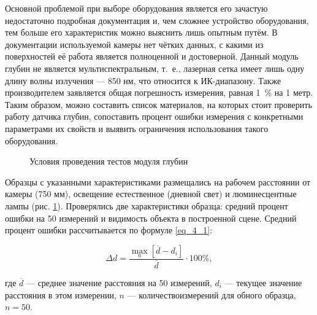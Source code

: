 Основной проблемой при выборе оборудования является его зачастую недостаточно подробная документация и, чем сложнее устройство оборудования, тем больше его характеристик можно выяснить лишь опытным путём. В документации используемой камеры нет чётких данных, с какими из поверхностей её работа является полноценной и достоверной. Данный модуль глубин не является мультиспектральным, т.~е., лазерная сетка имеет лишь одну длину волны излучения --- 850 нм, что относится к ИК-диапазону. Также производителем заявляется общая погрешность измерения, равная 1~\% на 1 метр. Таким образом, можно составить список материалов, на которых стоит проверить работу датчика глубин, сопоставить процент ошибки измерения с конкретными параметрами их свойств и выявить ограничения использования такого оборудования.

\begin{figure}[ht]
	\caption{Условия проведения тестов модуля глубин}\label{fig:izmer}
\end{figure}

Образцы с указанными характеристиками размещались на рабочем расстоянии от камеры (750 мм), освещение естественное (дневной свет) и люминесцентные лампы (рис. \cref{fig:izmer}). Проверялись две характеристики образца: средний процент ошибки на 50 измерений и видимость объекта в построенной сцене. Средний процент ошибки рассчитывается по формуле \cref{eq_4_1}:

\begin{equation}
\Delta d = \frac {\max_{n} [\overline{d} - d_i]} {\overline{d}} \cdot 100 \%,
\label{eq_4_1}
\end{equation}

где $\overline{d}$ --- среднее значение расстояния на 50 измерений, $d_i$ --- текущее значение расстояния в этом измерении, $n$ --- количествоизмерений для обного образца, $n = 50$.

